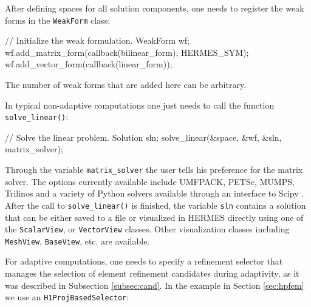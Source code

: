 \documentclass[final,3p,times,twocolumn]{elsarticle}
\begin{document}
After defining spaces for all solution components, 
one needs to register the weak forms in the {\tt WeakForm}
class:

\begin{code}
  // Initialize the weak formulation.
  WeakForm wf;
  wf.add_matrix_form(callback(bilinear_form), HERMES_SYM);
  wf.add_vector_form(callback(linear_form));
\end{code}
The number of weak forms that are added here 
can be arbitrary. 

In typical non-adaptive computations one just needs 
to call the function {\tt solve\_linear()}:

\begin{code}
  // Solve the linear problem.
  Solution sln;
  solve_linear(&space, &wf, &sln, matrix_solver);
\end{code}
Through the variable {\tt matrix\_solver} the user tells 
his preference for the matrix solver. The options 
currently available include UMFPACK, PETSc, MUMPS, 
Trilinos and a variety of Python solvers available through 
an interface to Scipy \cite{scipy}. After the call to 
{\tt solve\_linear()} is finished, the variable {\tt sln}
contains a solution that can be either saved to a file
or visualized in HERMES directly using one of the {\tt ScalarView},
or {\tt VectorView} classes. Other visualization classes 
including {\tt MeshView}, {\tt BaseView}, etc. are available.

For adaptive computations, one needs to specify a refinement 
selector that manages the selection of element refinement 
candidates during adaptivity, as it was described in 
Subsection \ref{subsec:cand}. In the example in Section \ref{sec:hpfem}
we use an {\tt H1ProjBasedSelector}:
\end{document}
